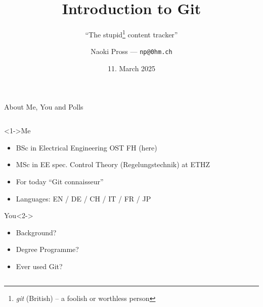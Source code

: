 \documentclass[xetex]{beamer}
\title{
  Introduction to Git
}
\subtitle{
  ``The stupid\footnote{
    \emph{git} (British) -- a foolish or worthless person}
  content tracker''
}
\author{
  Naoki Pross --- \texttt{np@0hm.ch}
}
\institute{}
\date{11. March 2025}
\begin{document}
\frame{\titlepage}

\begin{frame}[fragile]{About Me, You and Polls}
  \begin{columns}[b]
    \begin{column}{.5\linewidth}
      \begin{block}<1->{Me}
        \begin{itemize}
          \item BSc in Electrical Engineering OST FH (here)
          \item MSc in EE spec. Control Theory (Regelungstechnik) at ETHZ
          \item For today ``Git connaisseur''
          \item Languages: EN / DE / CH / IT / FR / JP
        \end{itemize}
      \end{block}

      \begin{exampleblock}{You}<2->
        \begin{itemize}
          \item Background?
          \item Degree Programme?
          \item Ever used Git?
        \end{itemize}
      \end{exampleblock}
    \end{column}
    \begin{column}{.5\linewidth}
    \end{column}
  \end{columns}
\end{frame}
\end{document}
